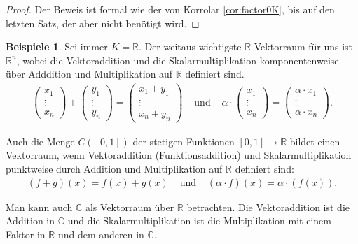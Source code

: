 \documentclass[index=totoc]{scrartcl}%
\theoremstyle{definition}
\newtheorem{bspe}[defi]{Beispiele}
\newcommand{\R}{\mathbb R}
\newcommand{\C}{\mathbb C}
\begin{document}
\begin{proof}
  Der Beweis ist formal wie der von Korrolar \ref{cor:factor0K},
  bis auf den letzten Satz, der aber nicht benötigt wird. 
\end{proof}

\begin{bspe}
  Sei immer $K=\R$. Der weitaus wichtigste $\R$-Vektorraum für uns ist $\R^n$,
  wobei die Vektoraddition und die Skalarmultiplikation
  komponentenweise über Adddition und Multiplikation auf $\R$ definiert sind.
  \begin{eqnarray*}
    \left(\begin{array}{c}x_1    \\\vdots\\x_n    \end{array}\right)+
    \left(\begin{array}{c}    y_1\\\vdots\\    y_n\end{array}\right)=
    \left(\begin{array}{c}x_1+y_1\\\vdots\\x_n+y_n\end{array}\right)
    &\text{ und }&
    \alpha\cdot
    \left(
    \begin{array}{c}            x_1\\\vdots\\           x_n\end{array}\right)=
    \left(
    \begin{array}{c}\alpha\cdot x_1\\\vdots\\\alpha\cdot x_n\end{array}\right).
  \end{eqnarray*}

  Auch die Menge $C([0,1])$ der stetigen Funktionen $[0,1]\to\R$
  bildet einen Vektorraum,
  wenn Vektoraddition (Funktionsaddition) und Skalarmultiplikation
  punktweise durch Addition und Multiplikation auf $\R$  definiert sind:
  \begin{eqnarray*}
    (f+g)(x) = f(x)+g(x)
    &\text{ und }&
    (\alpha\cdot f)(x)=\alpha\cdot(f(x)). 
  \end{eqnarray*}

  Man kann auch $\C$ als Vektorraum über $\R$ betrachten.
  Die Vektoraddition ist die Addition in $\C$
  und die Skalarmultiplikation ist die Multiplikation
  mit einem Faktor in $\R$ und dem anderen in $\C$. 
\end{bspe}
\end{document}
